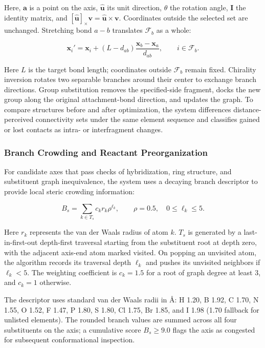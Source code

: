 Here, $\mathbf{a}$ is a point on the axis, $\hat{\mathbf{u}}$ its unit direction, $\theta$ the rotation angle, $\mathbf{I}$ the identity matrix, and $[\hat{\mathbf{u}}]_\times \mathbf{v}=\hat{\mathbf{u}}\times\mathbf{v}$. Coordinates outside the selected set are unchanged. Stretching bond $a-b$ translates $\mathcal{F}_b$ as a whole:

\begin{equation}\label{eq:methods-03}
\mathbf{x}_i'=\mathbf{x}_i+(L-d_{ab})\frac{\mathbf{x}_b-\mathbf{x}_a}{d_{ab}},\qquad i\in\mathcal{F}_b.
\end{equation}

Here $L$ is the target bond length; coordinates outside $\mathcal{F}_b$ remain fixed. Chirality inversion rotates two separable branches around their center to exchange branch directions. Group substitution removes the specified-side fragment, docks the new group along the original attachment-bond direction, and updates the graph. To compare structures before and after optimization, the system differences distance-perceived connectivity sets under the same element sequence and classifies gained or lost contacts as intra- or interfragment changes.

\subsubsection{Branch Crowding and Reactant Preorganization}
For candidate axes that pass checks of hybridization, ring structure, and substituent graph inequivalence, the system uses a decaying branch descriptor to provide local steric crowding information:

\begin{equation}\label{eq:methods-04}
B_s=\sum_{k\in T_s} c_k r_k \rho^{\ell_k},\qquad\rho=0.5,\quad 0\le \ell_k\le 5.
\end{equation}

Here $r_k$ represents the van der Waals radius of atom $k$. $T_s$ is generated by a last-in-first-out depth-first traversal starting from the substituent root at depth zero, with the adjacent axis-end atom marked visited. On popping an unvisited atom, the algorithm records its traversal depth $\ell_k$ and pushes its unvisited neighbors if $\ell_k<5$. The weighting coefficient is $c_k=1.5$ for a root of graph degree at least 3, and $c_k=1$ otherwise.

The descriptor uses standard van der Waals radii in Å: H 1.20, B 1.92, C 1.70, N 1.55, O 1.52, F 1.47, P 1.80, S 1.80, Cl 1.75, Br 1.85, and I 1.98 (1.70 fallback for unlisted elements). The rounded branch values are summed across all four substituents on the axis; a cumulative score $B_s\ge 9.0$ flags the axis as congested for subsequent conformational inspection.

